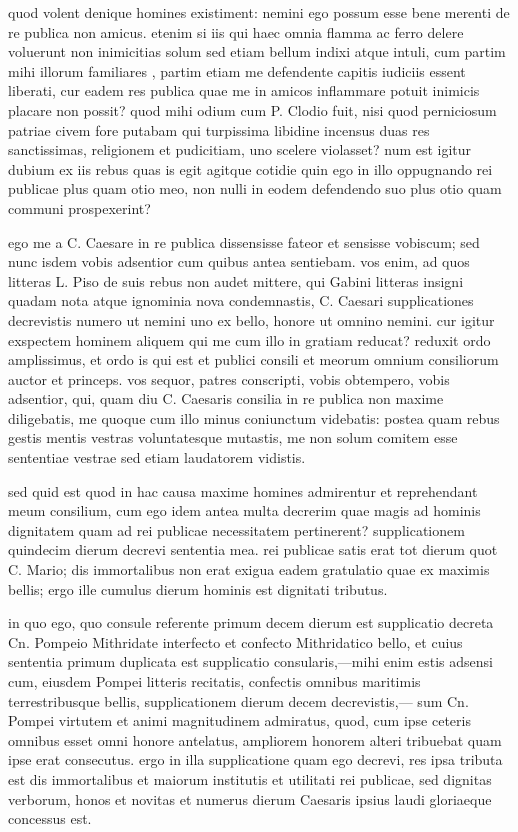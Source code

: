  quod volent denique homines existiment: nemini ego possum esse bene merenti de re publica non amicus. etenim si iis qui haec omnia flamma ac ferro delere voluerunt non inimicitias solum sed etiam bellum indixi atque intuli, cum partim mihi illorum familiares , partim etiam me defendente capitis iudiciis essent liberati, cur eadem res publica quae me in amicos inflammare potuit inimicis placare non possit? quod mihi odium cum P. Clodio fuit, nisi quod perniciosum patriae civem fore putabam qui turpissima libidine incensus duas res sanctissimas, religionem et pudicitiam, uno scelere violasset? num est igitur dubium ex iis rebus quas is egit agitque cotidie quin ego in illo oppugnando rei publicae plus quam otio meo, non nulli in eodem defendendo suo plus otio quam communi prospexerint?

 ego me a C. Caesare in re publica dissensisse fateor et sensisse vobiscum; sed nunc isdem vobis adsentior cum quibus antea sentiebam. vos enim, ad quos litteras L. Piso de suis rebus non audet mittere, qui Gabini litteras insigni quadam nota atque ignominia nova condemnastis, C. Caesari supplicationes decrevistis numero ut nemini uno ex bello, honore ut omnino nemini. cur igitur exspectem hominem aliquem qui me cum illo in gratiam reducat? reduxit ordo amplissimus, et ordo is qui est et publici consili et meorum omnium consiliorum auctor et princeps. vos sequor, patres conscripti, vobis obtempero, vobis adsentior, qui, quam diu C. Caesaris consilia in re publica non maxime diligebatis, me quoque cum illo minus coniunctum videbatis: postea quam rebus gestis mentis vestras voluntatesque mutastis, me non solum comitem esse sententiae vestrae sed etiam laudatorem vidistis.

 sed quid est quod in hac causa maxime homines admirentur et reprehendant meum consilium, cum ego idem antea multa decrerim quae magis ad hominis dignitatem quam ad rei publicae necessitatem pertinerent? supplicationem quindecim dierum decrevi sententia mea. rei publicae satis erat tot dierum quot C. Mario; dis immortalibus non erat exigua eadem gratulatio quae ex maximis bellis; ergo ille cumulus dierum hominis est dignitati tributus.

 in quo ego, quo consule referente primum decem dierum est supplicatio decreta Cn. Pompeio Mithridate interfecto et confecto Mithridatico bello, et cuius sententia primum duplicata est supplicatio consularis,—mihi enim estis adsensi cum, eiusdem Pompei litteris recitatis, confectis omnibus maritimis terrestribusque bellis, supplicationem dierum decem decrevistis,— sum Cn. Pompei virtutem et animi magnitudinem admiratus, quod, cum ipse ceteris omnibus esset omni honore antelatus, ampliorem honorem alteri tribuebat quam ipse erat consecutus. ergo in illa supplicatione quam ego decrevi, res ipsa tributa est dis immortalibus et maiorum institutis et utilitati rei publicae, sed dignitas verborum, honos et novitas et numerus dierum Caesaris ipsius laudi gloriaeque concessus est.

